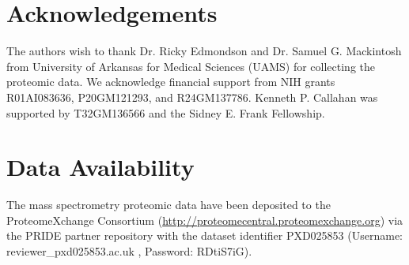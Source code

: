 \documentclass[journal=jprobs,manuscript=article]{achemso}
\begin{document}
\section{Acknowledgements}

The authors wish to thank Dr. Ricky Edmondson and Dr. Samuel G. Mackintosh from University of Arkansas for Medical Sciences (UAMS) for collecting the proteomic data. We acknowledge financial support from NIH grants R01AI083636, P20GM121293, and R24GM137786. Kenneth P. Callahan was supported by T32GM136566 and the Sidney E. Frank Fellowship.

\section{Data Availability}

The mass spectrometry proteomic data have been deposited to the ProteomeXchange Consortium (\href{http://proteomecentral.proteomexchange.org}{http://proteomecentral.proteomexchange.org}) via the PRIDE partner repository\cite{vizcaino2012proteomics} with the dataset identifier PXD025853 (Username: reviewer\_pxd025853\@ebi.ac.uk , Password: RDtiS7iG).  



\end{document}
